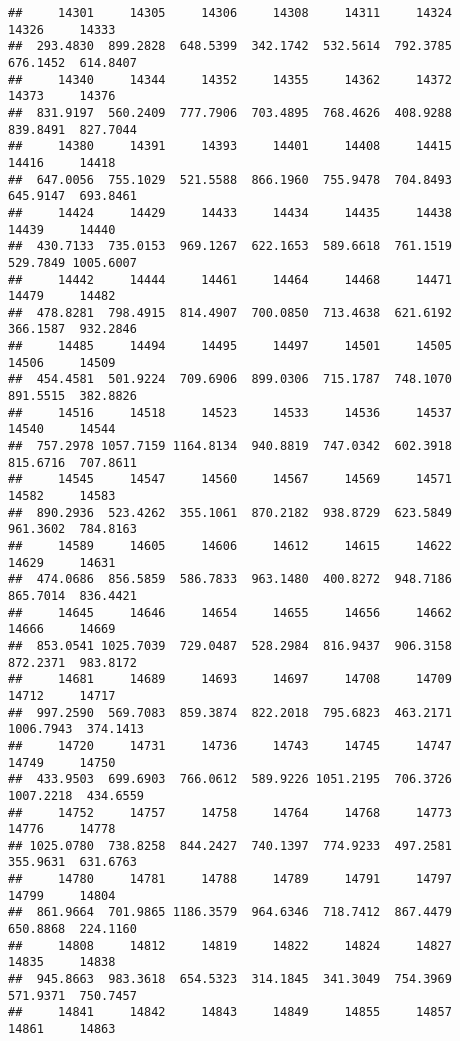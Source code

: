 \documentclass[
]{article}
\begin{document}
\begin{verbatim}
##     14301     14305     14306     14308     14311     14324     14326     14333 
##  293.4830  899.2828  648.5399  342.1742  532.5614  792.3785  676.1452  614.8407 
##     14340     14344     14352     14355     14362     14372     14373     14376 
##  831.9197  560.2409  777.7906  703.4895  768.4626  408.9288  839.8491  827.7044 
##     14380     14391     14393     14401     14408     14415     14416     14418 
##  647.0056  755.1029  521.5588  866.1960  755.9478  704.8493  645.9147  693.8461 
##     14424     14429     14433     14434     14435     14438     14439     14440 
##  430.7133  735.0153  969.1267  622.1653  589.6618  761.1519  529.7849 1005.6007 
##     14442     14444     14461     14464     14468     14471     14479     14482 
##  478.8281  798.4915  814.4907  700.0850  713.4638  621.6192  366.1587  932.2846 
##     14485     14494     14495     14497     14501     14505     14506     14509 
##  454.4581  501.9224  709.6906  899.0306  715.1787  748.1070  891.5515  382.8826 
##     14516     14518     14523     14533     14536     14537     14540     14544 
##  757.2978 1057.7159 1164.8134  940.8819  747.0342  602.3918  815.6716  707.8611 
##     14545     14547     14560     14567     14569     14571     14582     14583 
##  890.2936  523.4262  355.1061  870.2182  938.8729  623.5849  961.3602  784.8163 
##     14589     14605     14606     14612     14615     14622     14629     14631 
##  474.0686  856.5859  586.7833  963.1480  400.8272  948.7186  865.7014  836.4421 
##     14645     14646     14654     14655     14656     14662     14666     14669 
##  853.0541 1025.7039  729.0487  528.2984  816.9437  906.3158  872.2371  983.8172 
##     14681     14689     14693     14697     14708     14709     14712     14717 
##  997.2590  569.7083  859.3874  822.2018  795.6823  463.2171 1006.7943  374.1413 
##     14720     14731     14736     14743     14745     14747     14749     14750 
##  433.9503  699.6903  766.0612  589.9226 1051.2195  706.3726 1007.2218  434.6559 
##     14752     14757     14758     14764     14768     14773     14776     14778 
## 1025.0780  738.8258  844.2427  740.1397  774.9233  497.2581  355.9631  631.6763 
##     14780     14781     14788     14789     14791     14797     14799     14804 
##  861.9664  701.9865 1186.3579  964.6346  718.7412  867.4479  650.8868  224.1160 
##     14808     14812     14819     14822     14824     14827     14835     14838 
##  945.8663  983.3618  654.5323  314.1845  341.3049  754.3969  571.9371  750.7457 
##     14841     14842     14843     14849     14855     14857     14861     14863 

\end{verbatim}
\end{document}
